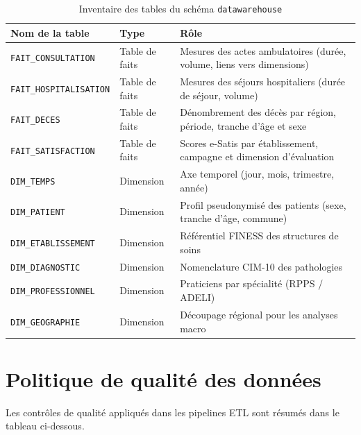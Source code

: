 \documentclass[12pt, a4paper]{report}
\begin{document}
\begin{itemize}[label=\textcolor{chuBlue}{\textbullet}]
\begin{table}[htbp]
\centering\footnotesize\renewcommand{\arraystretch}{1.5}
\begin{tabularx}{\linewidth}{@{} L{4.5cm} L{2.5cm} X @{}}
\toprule
{}
\textbf{Nom de la table} & \textbf{Type} & \textbf{Rôle} \\
\midrule
\texttt{FAIT\_CONSULTATION} & Table de faits &
Mesures des actes ambulatoires (durée, volume, liens vers dimensions) \\
\texttt{FAIT\_HOSPITALISATION} & Table de faits &
Mesures des séjours hospitaliers (durée de séjour, volume) \\
\texttt{FAIT\_DECES} & Table de faits &
Dénombrement des décès par région, période, tranche d'âge et sexe \\
\texttt{FAIT\_SATISFACTION} & Table de faits &
Scores e-Satis par établissement, campagne et dimension d'évaluation \\
\texttt{DIM\_TEMPS} & Dimension &
Axe temporel (jour, mois, trimestre, année) \\
\texttt{DIM\_PATIENT} & Dimension &
Profil pseudonymisé des patients (sexe, tranche d'âge, commune) \\
\texttt{DIM\_ETABLISSEMENT} & Dimension &
Référentiel FINESS des structures de soins \\
\texttt{DIM\_DIAGNOSTIC} & Dimension &
Nomenclature CIM-10 des pathologies \\
\texttt{DIM\_PROFESSIONNEL} & Dimension &
Praticiens par spécialité (RPPS / ADELI) \\
\texttt{DIM\_GEOGRAPHIE} & Dimension &
Découpage régional pour les analyses macro \\
\bottomrule
\end{tabularx}
\caption{Inventaire des tables du schéma \texttt{datawarehouse}}
\label{tab:inventaire_tables}
\end{table}

\clearpage

\chapter{Politique de qualité des données}

Les contrôles de qualité appliqués dans les pipelines ETL sont résumés dans le tableau ci-dessous.


\end{itemize}
\end{document}
